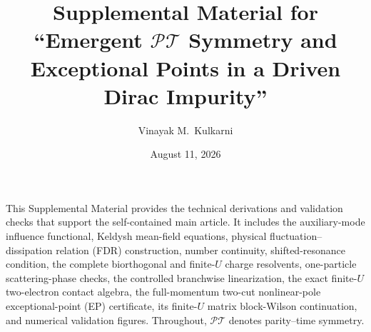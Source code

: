 \documentclass[%
  aps,prb,reprint,amsmath,amssymb,superscriptaddress,longbibliography,floatfix
]{revtex4-2}
\newcommand{\PT}{\mathcal{PT}}
\begin{document}
\title{Supplemental Material for ``Emergent $\PT$ Symmetry and Exceptional Points in a Driven Dirac Impurity''}
\author{Vinayak M.~Kulkarni}
\date{August 11, 2026}
\maketitle

This Supplemental Material provides the technical derivations and validation
checks that support the self-contained main article.  It includes the
auxiliary-mode influence functional, Keldysh mean-field equations, physical
fluctuation--dissipation relation (FDR) construction, number continuity,
shifted-resonance condition, the complete
biorthogonal and finite-$U$ charge resolvents, one-particle scattering-phase
checks, the controlled branchwise linearization, the exact finite-$U$
two-electron contact algebra, the full-momentum two-cut nonlinear-pole
exceptional-point (EP) certificate, its finite-\(U\) matrix block-Wilson
continuation, and numerical
validation figures.
Throughout, $\PT$ denotes parity--time symmetry.
\end{document}
